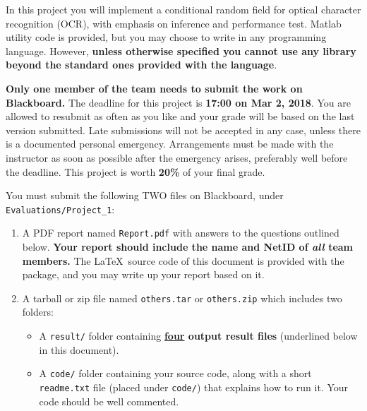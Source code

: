 \documentclass[11pt]{report}
\begin{document}
\maketitle


In this project you will implement a conditional random field for optical character recognition (OCR),
with emphasis on inference and performance test.
Matlab utility code is provided, but you may choose to write in any programming
language.
However, {\bf unless otherwise specified you cannot use any library beyond the standard ones provided with the language}.

{\bf Only one member of the team needs to submit the work on Blackboard.}
The deadline for this project is {\bf 17:00 on Mar 2, 2018}.
You are allowed to resubmit as often
as you like and your grade will be based on the last version submitted.
Late submissions will not be accepted in any case, unless there is a documented personal emergency.  Arrangements must be made with the instructor as soon as possible after the emergency arises,
preferably well before the deadline.
This project is worth {\bf 20\%} of your final grade.

You must submit the following TWO files on Blackboard, under \verb#Evaluations/Project_1#:
\vspace{-1em}
\begin{enumerate}
  \item  A PDF report named \verb#Report.pdf# with answers to the questions outlined below.
    {\bf Your report should include the name and NetID of \emph{all} team members.}
    The \LaTeX\ source code of this document is provided with the package, and you may write up your report based on it.
  \item A tarball or zip file named \verb#others.tar# or \verb#others.zip# which includes two folders: 
  \begin{itemize}[leftmargin=*]
  	\item A \verb#result/# folder containing {\bf \underline{four} output result files} (underlined below in this document).
  	\item A \verb#code/# folder containing your source code, along with a short \verb#readme.txt# file (placed under \verb#code/#) that explains how to run it.
  	  Your code should be well commented.
  \end{itemize}
\end{enumerate}
\vspace{-1em}
\end{document}
